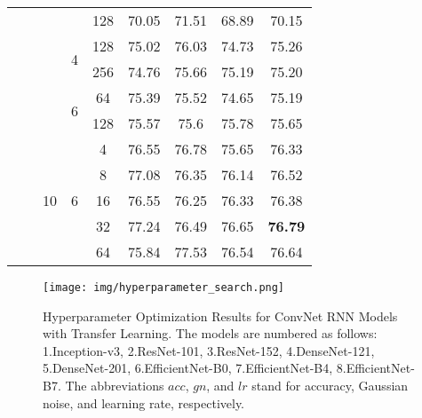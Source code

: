 \documentclass[fleqn,10pt]{wlscirep}
\begin{document}
\begin{table*}
{\begin{tabular}{|c|c|c|c|c|c|c|c|c|}
\cline{5-9}
                                           &                       &                     &                    & 128        & 70.05 & 71.51 & 68.89 & 70.15  \\ 
\cline{4-9}
                                           &                       &                     & \multirow{2}{*}{4} & 128        & 75.02 & 76.03 & 74.73 & 75.26  \\ 
\cline{5-9}
                                           &                       &                     &                    & 256        & 74.76 & 75.66 & 75.19 & 75.20  \\ 
\cline{4-9}
                                           &                       &                     & \multirow{2}{*}{6} & 64         & 75.39 & 75.52 & 74.65 & 75.19  \\ 
\cline{5-9}
                                           &                       &                     &                    & 128        & 75.57 & 75.6  & 75.78 & 75.65  \\ 
\cline{3-9}
                                           &                       & \multirow{5}{*}{10} & \multirow{5}{*}{6} & 4          & 76.55 & 76.78 & 75.65 & 76.33  \\ 
\cline{5-9}
                                           &                       &                     &                    & 8          & 77.08 & 76.35 & 76.14 & 76.52  \\ 
\cline{5-9}
                                           &                       &                     &                    & 16         & 76.55 & 76.25 & 76.33 & 76.38  \\ 
\cline{5-9}
                                           &                       &                     &                    & 32         & 77.24 & 76.49 & 76.65 & \textbf{76.79}  \\ 
\cline{5-9}
                                           &                       &                     &                    & 64         & 75.84 & 77.53 & 76.54 & 76.64  \\
\hline
\end{tabular}
}
\end{table*} \begin{figure}[htb!]
\begin{center}
\texttt{[image: img/hyperparameter\_search.png]}
\caption{Hyperparameter Optimization Results for ConvNet RNN Models with Transfer Learning. The models are numbered as follows: 1.Inception-v3, 2.ResNet-101, 3.ResNet-152, 4.DenseNet-121, 5.DenseNet-201, 6.EfficientNet-B0, 7.EfficientNet-B4, 8.EfficientNet-B7. The abbreviations $acc$, $gn$, and $lr$ stand for accuracy, Gaussian noise, and learning rate, respectively.}
\label{fig:hyperparameter_search}
\end{center}
\end{figure}
\end{document}
